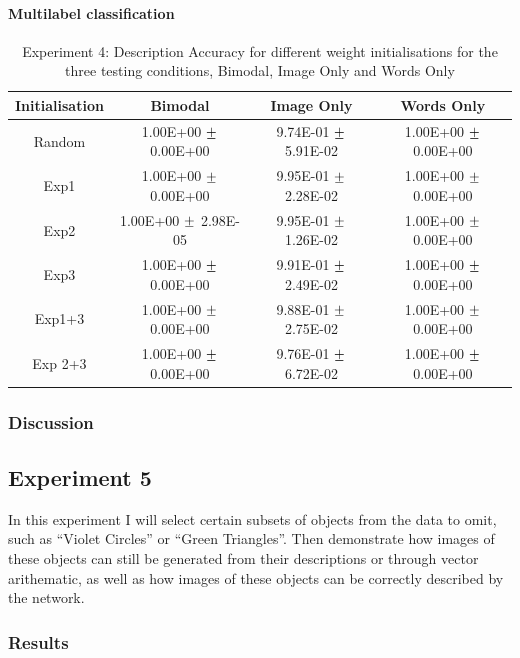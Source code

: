 \paragraph{Multilabel classification}


\begin{table}[h!]
\centering
	\begin{tabular}{|c|c|c|c|}
	\hline
	Initialisation & 	Bimodal & 	Image Only 	& 	Words Only \\ \hline
Random	&	1.00E+00	$\mypm$	0.00E+00	&	9.74E-01	$\mypm$	5.91E-02	&	1.00E+00	$\mypm$	0.00E+00\\ \hline
Exp1	&	1.00E+00	$\mypm$	0.00E+00	&	9.95E-01	$\mypm$	2.28E-02	&	1.00E+00	$\mypm$	0.00E+00\\ \hline
Exp2	&	1.00E+00	$\mypm$	2.98E-05	&	9.95E-01	$\mypm$	1.26E-02	&	1.00E+00	$\mypm$	0.00E+00\\ \hline
Exp3	&	1.00E+00	$\mypm$	0.00E+00	&	9.91E-01	$\mypm$	2.49E-02	&	1.00E+00	$\mypm$	0.00E+00\\ \hline
Exp1+3	&	1.00E+00	$\mypm$	0.00E+00	&	9.88E-01	$\mypm$	2.75E-02	&	1.00E+00	$\mypm$	0.00E+00\\ \hline
Exp 2+3	&	1.00E+00	$\mypm$	0.00E+00	&	9.76E-01	$\mypm$	6.72E-02	&	1.00E+00	$\mypm$	0.00E+00\\ \hline


	\end{tabular}
\caption{Experiment 4: Description Accuracy for different weight initialisations for the three testing conditions, Bimodal, Image Only and Words Only}
\label{tab:res739acc}
\end{table}


\subsubsection{Discussion}

\subsection{Experiment 5}
In this experiment I will select certain subsets of objects from the data to omit, such as ``Violet Circles'' or ``Green Triangles''. Then demonstrate how images of these objects can still be generated from their descriptions or through vector arithematic, as well as how images of these objects can be correctly described by the network.

\subsubsection{Results}




